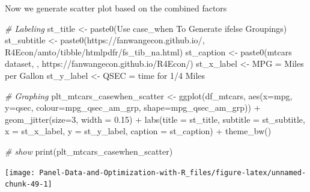 \documentclass[
]{book}
\newenvironment{Shaded}{\begin{snugshade}}{\end{snugshade}}
\newcommand{\AttributeTok}[1]{\textcolor[rgb]{0.77,0.63,0.00}{#1}}
\newcommand{\CommentTok}[1]{\textcolor[rgb]{0.56,0.35,0.01}{\textit{#1}}}
\newcommand{\DecValTok}[1]{\textcolor[rgb]{0.00,0.00,0.81}{#1}}
\newcommand{\FloatTok}[1]{\textcolor[rgb]{0.00,0.00,0.81}{#1}}
\newcommand{\FunctionTok}[1]{\textcolor[rgb]{0.00,0.00,0.00}{#1}}
\newcommand{\NormalTok}[1]{#1}
\newcommand{\OtherTok}[1]{\textcolor[rgb]{0.56,0.35,0.01}{#1}}
\newcommand{\SpecialCharTok}[1]{\textcolor[rgb]{0.00,0.00,0.00}{#1}}
\newcommand{\StringTok}[1]{\textcolor[rgb]{0.31,0.60,0.02}{#1}}
\begin{document}
Now we generate scatter plot based on the combined factors

\begin{Shaded}
\begin{Highlighting}[]
\CommentTok{\# Labeling}
\NormalTok{st\_title }\OtherTok{\textless{}{-}} \FunctionTok{paste0}\NormalTok{(}\StringTok{\textquotesingle{}Use case\_when To Generate ifelse Groupings\textquotesingle{}}\NormalTok{)}
\NormalTok{st\_subtitle }\OtherTok{\textless{}{-}} \FunctionTok{paste0}\NormalTok{(}\StringTok{\textquotesingle{}https://fanwangecon.github.io/\textquotesingle{}}\NormalTok{,}
                      \StringTok{\textquotesingle{}R4Econ/amto/tibble/htmlpdfr/fs\_tib\_na.html\textquotesingle{}}\NormalTok{)}
\NormalTok{st\_caption }\OtherTok{\textless{}{-}} \FunctionTok{paste0}\NormalTok{(}\StringTok{\textquotesingle{}mtcars dataset, \textquotesingle{}}\NormalTok{,}
                     \StringTok{\textquotesingle{}https://fanwangecon.github.io/R4Econ/\textquotesingle{}}\NormalTok{)}
\NormalTok{st\_x\_label }\OtherTok{\textless{}{-}} \StringTok{\textquotesingle{}MPG = Miles per Gallon\textquotesingle{}}
\NormalTok{st\_y\_label }\OtherTok{\textless{}{-}} \StringTok{\textquotesingle{}QSEC = time for 1/4 Miles\textquotesingle{}}

\CommentTok{\# Graphing}
\NormalTok{plt\_mtcars\_casewhen\_scatter }\OtherTok{\textless{}{-}} 
  \FunctionTok{ggplot}\NormalTok{(df\_mtcars, }
         \FunctionTok{aes}\NormalTok{(}\AttributeTok{x=}\NormalTok{mpg, }\AttributeTok{y=}\NormalTok{qsec, }
             \AttributeTok{colour=}\NormalTok{mpg\_qsec\_am\_grp, }
             \AttributeTok{shape=}\NormalTok{mpg\_qsec\_am\_grp)) }\SpecialCharTok{+}
  \FunctionTok{geom\_jitter}\NormalTok{(}\AttributeTok{size=}\DecValTok{3}\NormalTok{, }\AttributeTok{width =} \FloatTok{0.15}\NormalTok{) }\SpecialCharTok{+}
  \FunctionTok{labs}\NormalTok{(}\AttributeTok{title =}\NormalTok{ st\_title, }\AttributeTok{subtitle =}\NormalTok{ st\_subtitle,}
       \AttributeTok{x =}\NormalTok{ st\_x\_label, }\AttributeTok{y =}\NormalTok{ st\_y\_label, }\AttributeTok{caption =}\NormalTok{ st\_caption) }\SpecialCharTok{+}
  \FunctionTok{theme\_bw}\NormalTok{()}

\CommentTok{\# show}
\FunctionTok{print}\NormalTok{(plt\_mtcars\_casewhen\_scatter)}
\end{Highlighting}
\end{Shaded}

\begin{center}\texttt{[image: Panel-Data-and-Optimization-with-R\_files/figure-latex/unnamed-chunk-49-1]} \end{center}
\end{document}
